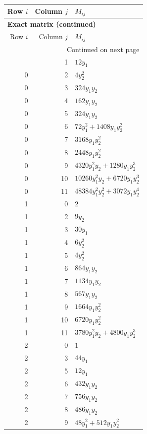 \documentclass[10pt,a4paper]{article}
\begin{document}
{\small\setlength{\tabcolsep}{7pt}\begin{longtable}{rrp{125mm}}
\toprule Row $i$ & Column $j$ & $M_{ij}$\\\midrule\endfirsthead
\multicolumn{3}{l}{\textbf{Exact matrix (continued)}}\\
\toprule Row $i$ & Column $j$ & $M_{ij}$\\\midrule\endhead
\midrule\multicolumn{3}{r}{Continued on next page}\\\endfoot\bottomrule\endlastfoot
0 & 1 & $12 y_{1}$\\
0 & 2 & $4 y_{2}^{2}$\\
0 & 3 & $324 y_{1} y_{2}$\\
0 & 4 & $162 y_{1} y_{2}$\\
0 & 5 & $324 y_{1} y_{2}$\\
0 & 6 & $72 y_{1}^{2} + 1408 y_{1} y_{2}^{2}$\\
0 & 7 & $3168 y_{1} y_{2}^{2}$\\
0 & 8 & $2448 y_{1} y_{2}^{2}$\\
0 & 9 & $4320 y_{1}^{2} y_{2} + 1280 y_{1} y_{2}^{3}$\\
0 & 10 & $10260 y_{1}^{2} y_{2} + 6720 y_{1} y_{2}^{3}$\\
0 & 11 & $48384 y_{1}^{2} y_{2}^{2} + 3072 y_{1} y_{2}^{4}$\\
1 & 0 & $2$\\
1 & 2 & $9 y_{2}$\\
1 & 3 & $30 y_{1}$\\
1 & 4 & $6 y_{2}^{2}$\\
1 & 5 & $4 y_{2}^{2}$\\
1 & 6 & $864 y_{1} y_{2}$\\
1 & 7 & $1134 y_{1} y_{2}$\\
1 & 8 & $567 y_{1} y_{2}$\\
1 & 9 & $1664 y_{1} y_{2}^{2}$\\
1 & 10 & $6720 y_{1} y_{2}^{2}$\\
1 & 11 & $3780 y_{1}^{2} y_{2} + 4800 y_{1} y_{2}^{3}$\\
2 & 0 & $1$\\
2 & 3 & $44 y_{1}$\\
2 & 5 & $12 y_{1}$\\
2 & 6 & $432 y_{1} y_{2}$\\
2 & 7 & $756 y_{1} y_{2}$\\
2 & 8 & $486 y_{1} y_{2}$\\
2 & 9 & $48 y_{1}^{2} + 512 y_{1} y_{2}^{2}$\\

\end{longtable}}
\end{document}
